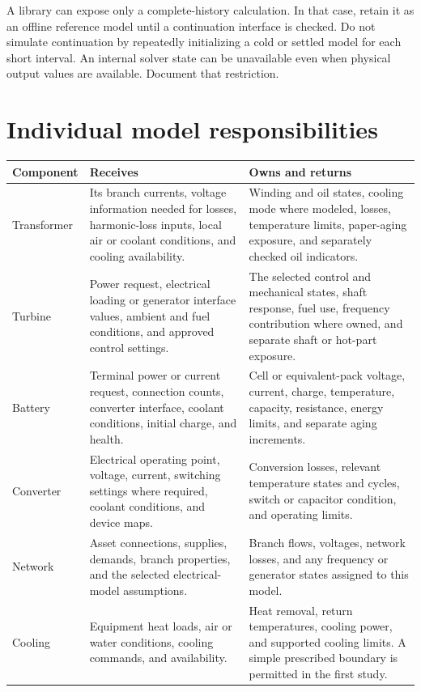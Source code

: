 \documentclass[11pt,a4paper]{report}
\begin{document}
A library can expose only a complete-history calculation.
In that case, retain it as an offline reference model until a continuation interface is checked.
Do not simulate continuation by repeatedly initializing a cold or settled model for each short interval.
An internal solver state can be unavailable even when physical output values are available.
Document that restriction.

\section{Individual model responsibilities}
\begin{longtable}{L{0.17\textwidth}L{0.36\textwidth}L{0.35\textwidth}}
\toprule Component & Receives & Owns and returns \\ \midrule\endhead
Transformer & Its branch currents, voltage information needed for losses, harmonic-loss inputs, local air or coolant conditions, and cooling availability. & Winding and oil states, cooling mode where modeled, losses, temperature limits, paper-aging exposure, and separately checked oil indicators. \\
Turbine & Power request, electrical loading or generator interface values, ambient and fuel conditions, and approved control settings. & The selected control and mechanical states, shaft response, fuel use, frequency contribution where owned, and separate shaft or hot-part exposure. \\
Battery & Terminal power or current request, connection counts, converter interface, coolant conditions, initial charge, and health. & Cell or equivalent-pack voltage, current, charge, temperature, capacity, resistance, energy limits, and separate aging increments. \\
Converter & Electrical operating point, voltage, current, switching settings where required, coolant conditions, and device maps. & Conversion losses, relevant temperature states and cycles, switch or capacitor condition, and operating limits. \\
Network & Asset connections, supplies, demands, branch properties, and the selected electrical-model assumptions. & Branch flows, voltages, network losses, and any frequency or generator states assigned to this model. \\
Cooling & Equipment heat loads, air or water conditions, cooling commands, and availability. & Heat removal, return temperatures, cooling power, and supported cooling limits. A simple prescribed boundary is permitted in the first study. \\
\bottomrule
\end{longtable}
\end{document}
